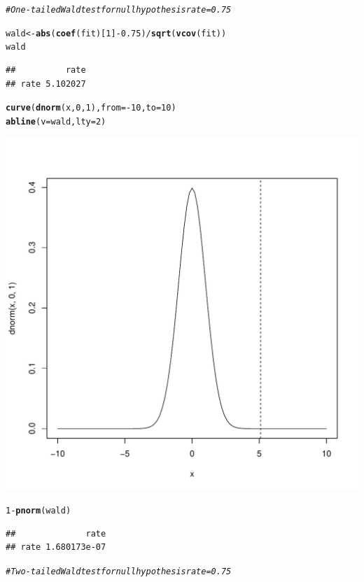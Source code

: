\documentclass[12pt]{article}\usepackage[]{graphicx}\usepackage[]{color}
\makeatletter
\def\maxwidth{ %
  \ifdim\Gin@nat@width>\linewidth
    \linewidth
  \else
    \Gin@nat@width
  \fi
}
\newcommand{\hlnum}[1]{\textcolor[rgb]{0.686,0.059,0.569}{#1}}%
\newcommand{\hlcom}[1]{\textcolor[rgb]{0.678,0.584,0.686}{\textit{#1}}}%
\newcommand{\hlopt}[1]{\textcolor[rgb]{0,0,0}{#1}}%
\newcommand{\hlstd}[1]{\textcolor[rgb]{0.345,0.345,0.345}{#1}}%
\newcommand{\hlkwb}[1]{\textcolor[rgb]{0.69,0.353,0.396}{#1}}%
\newcommand{\hlkwc}[1]{\textcolor[rgb]{0.333,0.667,0.333}{#1}}%
\newcommand{\hlkwd}[1]{\textcolor[rgb]{0.737,0.353,0.396}{\textbf{#1}}}%
\newenvironment{kframe}{%
 \def\at@end@of@kframe{}%
 \ifinner\ifhmode%
  \def\at@end@of@kframe{\end{minipage}}%
  \begin{minipage}{\columnwidth}%
 \fi\fi%
 \def\FrameCommand##1{\hskip\@totalleftmargin \hskip-\fboxsep
 \colorbox{shadecolor}{##1}\hskip-\fboxsep
     \hskip-\linewidth \hskip-\@totalleftmargin \hskip\columnwidth}%
 \MakeFramed {\advance\hsize-\width
   \@totalleftmargin\z@ \linewidth\hsize
   \@setminipage}}%
 {\par\unskip\endMakeFramed%
 \at@end@of@kframe}
\newenvironment{knitrout}{}{} %
\makeatother
\begin{document}
\begin{knitrout}
\color{fgcolor}\begin{kframe}
\begin{alltt}
\hlcom{# One-tailed Wald test for null hypothesis rate = 0.75}

\hlstd{wald} \hlkwb{<-} \hlkwd{abs}\hlstd{(}\hlkwd{coef}\hlstd{(fit)[}\hlnum{1}\hlstd{]} \hlopt{-} \hlnum{0.75}\hlstd{)}\hlopt{/}\hlkwd{sqrt}\hlstd{(}\hlkwd{vcov}\hlstd{(fit))}
\hlstd{wald}
\end{alltt}
\begin{verbatim}
##          rate
## rate 5.102027
\end{verbatim}
\begin{alltt}
\hlkwd{curve}\hlstd{(}\hlkwd{dnorm}\hlstd{(x,} \hlnum{0}\hlstd{,} \hlnum{1}\hlstd{),} \hlkwc{from} \hlstd{=} \hlopt{-}\hlnum{10}\hlstd{,} \hlkwc{to} \hlstd{=} \hlnum{10}\hlstd{)}
\hlkwd{abline}\hlstd{(}\hlkwc{v} \hlstd{= wald,} \hlkwc{lty} \hlstd{=} \hlnum{2}\hlstd{)}
\end{alltt}
\end{kframe}
\includegraphics[width=\maxwidth]{figure/unnamed-chunk-5-1} 
\begin{kframe}\begin{alltt}
\hlnum{1} \hlopt{-} \hlkwd{pnorm}\hlstd{(wald)}
\end{alltt}
\begin{verbatim}
##              rate
## rate 1.680173e-07
\end{verbatim}
\begin{alltt}
\hlcom{# Two-tailed Wald test for null hypothesis rate = 0.75}


\end{alltt}
\end{kframe}
\end{knitrout}
\end{document}
